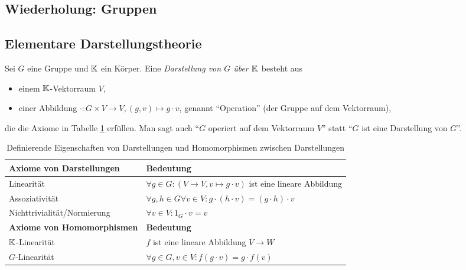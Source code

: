 \subsection{Wiederholung: Gruppen}


\subsection{Elementare Darstellungstheorie}

\begin{definition}[Darstellungen]\label{darstellungen:def}
Sei $G$ eine Gruppe und $\mathbb{K}$ ein Körper. Eine \emph{Darstellung von $G$ über $\mathbb{K}$} besteht aus
\begin{itemize}
	\item einem $\mathbb{K}$-Vektorraum $V$,
	\item einer Abbildung $\cdot: G \times V \to V, (g,v) \mapsto g\cdot v$, genannt \enquote{Operation} (der Gruppe auf dem Vektorraum),
\end{itemize}
die die Axiome in Tabelle \ref{darstellungen:def_table} erfüllen. Man sagt auch \enquote{$G$ operiert auf dem Vektorraum $V$} statt \enquote{$G$ ist eine Darstellung von $G$}.

\begin{table}[!ht]
	\setlength\extrarowheight{10pt} %
	\begin{tabularx}{\textwidth}{p{7cm} X}
		
		\toprule
		\textbf{Axiome von Darstellungen}                    & \textbf{Bedeutung} \\
		\midrule
        \hspace{1cm}Linearität                               & $\forall g\in G: (V\to V, v\mapsto g\cdot v)$ ist eine lineare Abbildung \\
		\hspace{1cm}Assoziativität                           & $\forall g,h\in G\forall v\in V: g\cdot (h\cdot v)=(g\cdot h)\cdot v$  \\
		\hspace{1cm}Nichttrivialität/Normierung              & $\forall v\in V: 1_G\cdot v=v$  \\
		\textbf{Axiome von Homomorphismen}                   & \textbf{Bedeutung} \\
        \midrule
        \hspace{1cm}$\mathbb{K}$-Linearität & $f$ ist eine lineare Abbildung $V\to W$ \\
        \hspace{1cm}$G$-Linearität & $\forall g\in G, v\in V: f(g\cdot v) = g\cdot f(v)$ \\
        \bottomrule
	\end{tabularx}
	\caption{Definierende Eigenschaften von Darstellungen und Homomorphismen zwischen Darstellungen}
    \label{darstellungen:def_table}
\end{table}


\end{definition}
